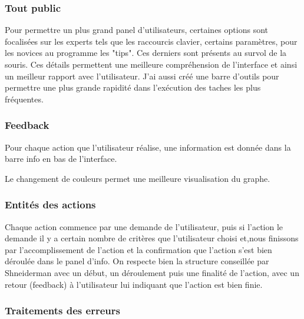 \documentclass[french]{article}
\begin{document}
  \subsubsection{Tout public}

    Pour permettre un plus grand panel d'utilisateurs, certaines options
    sont focalisées sur les experts tels que les raccourcis clavier, certains
    paramètres, pour les novices au programme les "tips". Ces derniers sont présents
    au survol de la souris. Ces détails permettent une meilleure compréhension
    de l'interface et ainsi un meilleur rapport avec l'utilisateur. J'ai
    aussi créé une barre d'outils pour permettre une plus grande rapidité
    dans l'exécution des taches les plus fréquentes.


  \subsubsection{Feedback}

    Pour chaque action que l'utilisateur réalise, une information est donnée
    dans la barre info en bas de l'interface.

    Le changement de couleurs permet une meilleure visualisation du graphe.


  \subsubsection{Entités des actions}

    Chaque action commence par une demande de l'utilisateur, puis si l'action le demande il
    y a certain nombre de critères que l'utilisateur choisi et,nous finissons par l'accomplissement
    de l'action et la confirmation que  l'action s'est bien déroulée dans le panel d'info. On
    respecte bien la structure conseillée par Shneiderman avec un début, un déroulement puis une finalité de l'action, avec un retour (feedback) à l'utilisateur lui indiquant que l'action est bien finie.


  \subsubsection{Traitements des erreurs}
\end{document}
